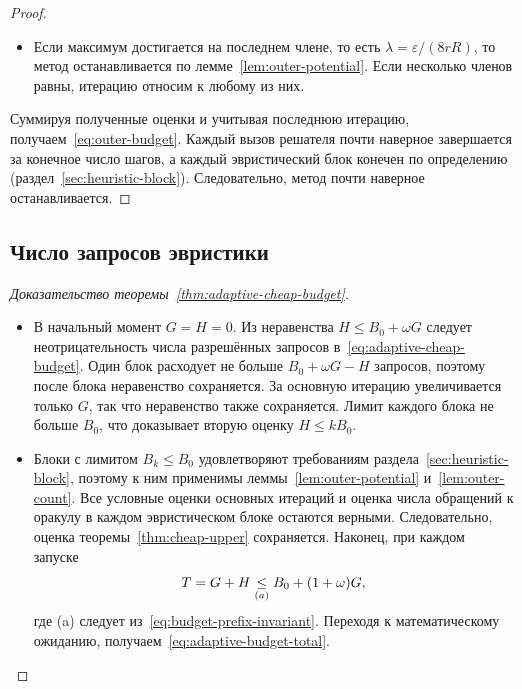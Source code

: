 \begin{proof}
\begin{itemize}
\item Если максимум достигается на последнем члене, то есть
$\lambda=\varepsilon/(8rR)$, то метод останавливается
по лемме~\ref{lem:outer-potential}.
Если несколько членов равны, итерацию относим к любому из них.
\end{itemize}
Суммируя полученные оценки и учитывая последнюю итерацию, получаем~\eqref{eq:outer-budget}.
Каждый вызов решателя почти наверное завершается за конечное число шагов,
а каждый эвристический блок конечен по определению
(раздел~\ref{sec:heuristic-block}).
Следовательно, метод
почти наверное останавливается.
\end{proof}

\subsection{Число запросов эвристики}\label{app:budget-proof}

\begin{proof}[Доказательство теоремы~\ref{thm:adaptive-cheap-budget}]
\leavevmode
\begin{itemize}
\item
В начальный момент $G=H=0$. Из неравенства $H\le B_0+\omega G$ следует
неотрицательность числа разрешённых запросов в~\eqref{eq:adaptive-cheap-budget}.
Один блок расходует не больше $B_0+\omega G-H$ запросов, поэтому после блока
неравенство сохраняется. За основную итерацию увеличивается только $G$,
так что неравенство также сохраняется. Лимит каждого блока не больше $B_0$, что
доказывает вторую оценку $H\le kB_0$.

\item
Блоки с лимитом $B_k\le B_0$ удовлетворяют требованиям
раздела~\ref{sec:heuristic-block},
поэтому к ним применимы леммы~\ref{lem:outer-potential}
и~\ref{lem:outer-count}.
Все условные оценки основных итераций и оценка числа обращений к оракулу
в каждом эвристическом блоке остаются верными. Следовательно, оценка
теоремы~\ref{thm:cheap-upper} сохраняется. Наконец, при каждом запуске
\[
 T=G+H\mathrel{\underset{(a)}{\le}}
 B_0+(1+\omega)G,
\]
где (a) следует из~\eqref{eq:budget-prefix-invariant}.
Переходя к математическому ожиданию, получаем~\eqref{eq:adaptive-budget-total}.
\end{itemize}
\end{proof}
